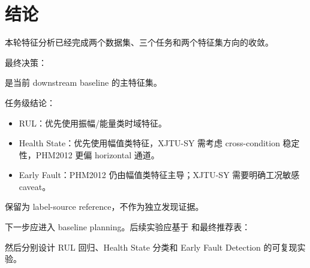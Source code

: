 \section{结论}

本轮特征分析已经完成两个数据集、三个任务和两个特征集方向的收敛。

最终决策：

\begin{center}
 是当前 downstream baseline 的主特征集。
\end{center}

任务级结论：

\begin{itemize}
  \item RUL：优先使用振幅/能量类时域特征。
  \item Health State：优先使用幅值类特征，XJTU-SY 需考虑 cross-condition 稳定性，PHM2012 更偏 horizontal 通道。
  \item Early Fault：PHM2012 仍由幅值类特征主导；XJTU-SY 需要明确工况敏感 caveat。
\end{itemize}

 保留为 label-source reference，不作为独立发现证据。

下一步应进入 baseline planning。后续实验应基于  和最终推荐表：

\begin{center}
\end{center}

然后分别设计 RUL 回归、Health State 分类和 Early Fault Detection 的可复现实验。
